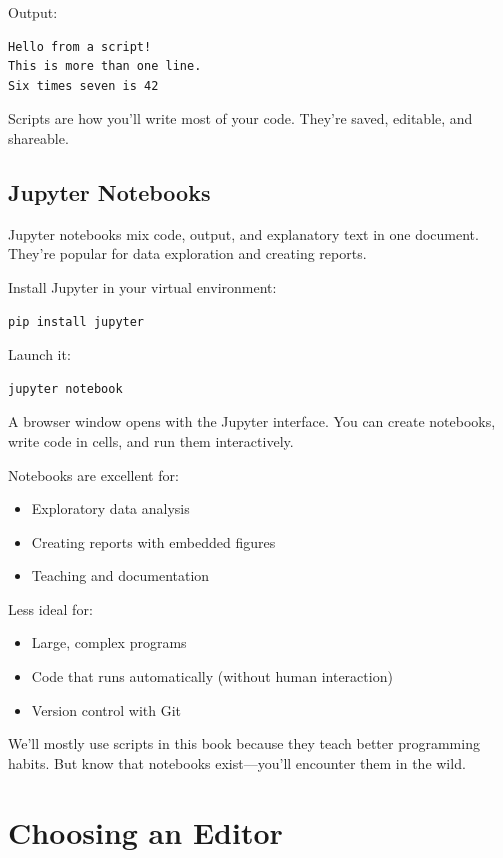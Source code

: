 Output:
\begin{lstlisting}[style=outputstyle]
Hello from a script!
This is more than one line.
Six times seven is 42
\end{lstlisting}

Scripts are how you'll write most of your code. They're saved, editable, and shareable.

\subsection{Jupyter Notebooks}

Jupyter notebooks mix code, output, and explanatory text in one document. They're popular for data exploration and creating reports.

Install Jupyter in your virtual environment:

\begin{lstlisting}[style=shellstyle]
pip install jupyter
\end{lstlisting}

Launch it:

\begin{lstlisting}[style=shellstyle]
jupyter notebook
\end{lstlisting}

A browser window opens with the Jupyter interface. You can create notebooks, write code in cells, and run them interactively.

Notebooks are excellent for:
\begin{itemize}
    \item Exploratory data analysis
    \item Creating reports with embedded figures
    \item Teaching and documentation
\end{itemize}

Less ideal for:
\begin{itemize}
    \item Large, complex programs
    \item Code that runs automatically (without human interaction)
    \item Version control with Git
\end{itemize}

We'll mostly use scripts in this book because they teach better programming habits. But know that notebooks exist---you'll encounter them in the wild.

\section{Choosing an Editor}
\label{sec:editor}


